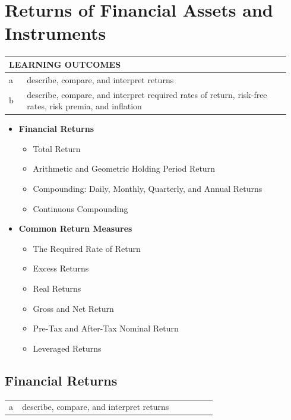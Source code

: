 \chapter{Returns of Financial Assets and Instruments}
\label{chap:Returns of Financial Assets and Instruments}

\begin{center}
\begin{tabular}{p{0.06\linewidth} | p{0.88\linewidth}}
	\toprule
	\multicolumn{2}{l}{\textbf{LEARNING OUTCOMES}} \\
	\midrule
	a & describe, compare, and interpret returns \\
	\midrule
	b & describe, compare, and interpret required rates of return, risk-free rates, risk premia, and inflation \\
	\bottomrule
\end{tabular}
\end{center}

\vspace{1.5em}

\begin{itemize}
	\item[] \textbf{Financial Returns}
	      \begin{itemize}
		      \item[] Total Return
		      \item[] Arithmetic and Geometric Holding Period Return
		      \item[] Compounding: Daily, Monthly, Quarterly, and Annual Returns
		      \item[] Continuous Compounding
	      \end{itemize}
	\item[] \textbf{Common Return Measures}
	      \begin{itemize}
		      \item[] The Required Rate of Return
		      \item[] Excess Returns
		      \item[] Real Returns
		      \item[] Gross and Net Return
		      \item[] Pre-Tax and After-Tax Nominal Return
		      \item[] Leveraged Returns
	      \end{itemize}
\end{itemize}

\section{Financial Returns}
\label{sec:Financial Returns}
\begin{center}
\begin{tabular}{p{0.06\linewidth} | p{0.88\linewidth}}
	a & describe, compare, and interpret returns \\
\end{tabular}
\end{center}

